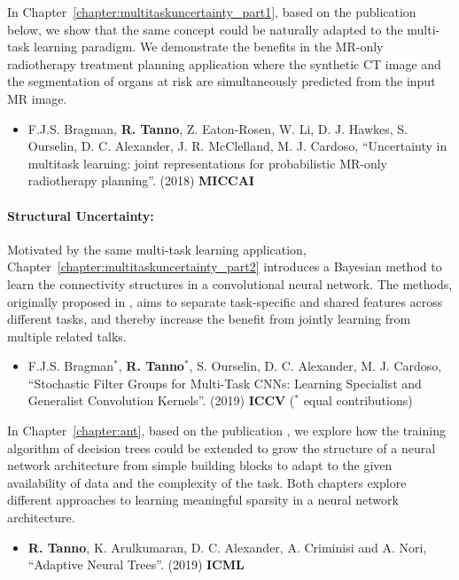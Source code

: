 	In Chapter~\ref{chapter:multitaskuncertainty_part1}, based on the publication \cite{bragman2018multi} below, we show that the same concept could be naturally adapted to the multi-task learning paradigm. We demonstrate the benefits in the MR-only radiotherapy treatment planning application where the synthetic CT image and the segmentation of organs at risk are simultaneously predicted from the input MR image. 
\begin{itemize}
	\footnotesize
	\item F.J.S. Bragman, \textbf{R. Tanno}, Z. Eaton-Rosen, W. Li, D. J. Hawkes, S. Ourselin, D. C. Alexander, J. R. McClelland, M. J. Cardoso, ``Uncertainty in multitask learning: joint representations for probabilistic MR-only radiotherapy planning''. (2018) \textbf{MICCAI}
\end{itemize}
	
\paragraph{Structural Uncertainty:} Motivated by the same multi-task learning application, Chapter~\ref{chapter:multitaskuncertainty_part2} introduces a Bayesian method to learn the connectivity structures in a convolutional neural network. The methods, originally proposed in \cite{sfg2019},  aims to separate task-specific and shared features across different tasks, and thereby increase the benefit from jointly learning from multiple related talks. 

\begin{itemize}
	\footnotesize
	\item F.J.S. Bragman$^*$, \textbf{R. Tanno}$^*$, S. Ourselin, D. C. Alexander, M. J. Cardoso, ``Stochastic Filter Groups for Multi-Task CNNs: Learning Specialist and Generalist Convolution Kernels''.  (2019) \textbf{ICCV} ($^*$ equal contributions)
\end{itemize}
	
In Chapter~\ref{chapter:ant}, based on the publication \cite{AdaptiveNeuralTrees19}, we explore how the training algorithm of decision trees could be extended to grow the structure of a neural network architecture from simple building blocks to adapt to the given availability of data and the complexity of the task. Both chapters explore different approaches to learning meaningful sparsity in a neural network architecture. 

\begin{itemize}
	\footnotesize
	\item \textbf{R. Tanno}, K. Arulkumaran, D. C. Alexander, A. Criminisi and A. Nori,  “Adaptive Neural Trees”.  (2019) \textbf{ICML }
\end{itemize}
	
